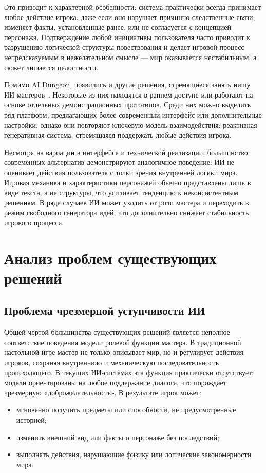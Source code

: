 Это приводит к характерной особенности: система практически всегда принимает любое действие игрока, даже если оно нарушает причинно-следственные связи, изменяет факты, установленные ранее, или не согласуется с концепцией персонажа. Подтверждение любой инициативы пользователя часто приводит к разрушению логической структуры повествования и делает игровой процесс непредсказуемым в нежелательном смысле --- мир оказывается нестабильным, а сюжет лишается целостности.

Помимо AI Dungeon, появились и другие решения, стремящиеся занять нишу ИИ-мастеров~\cite{AIDungeonChi,DungeonMasterAI,HyperWriteAI}. Некоторые из них находятся в раннем доступе или работают на основе отдельных демонстрационных прототипов. Среди них можно выделить ряд платформ, предлагающих более современный интерфейс или дополнительные настройки, однако они повторяют ключевую модель взаимодействия: реактивная генеративная система, стремящаяся поддержать любые действия игрока.

Несмотря на вариации в интерфейсе и технической реализации, большинство современных альтернатив демонстрируют аналогичное поведение: ИИ не оценивает действия пользователя с точки зрения внутренней логики мира. Игровая механика и характеристики персонажей обычно представлены лишь в виде текста, а не структуры, что усиливает тенденцию к неконсистентным решениям. В ряде случаев ИИ может уходить от роли мастера и переходить в режим свободного генератора идей, что дополнительно снижает стабильность игрового процесса.

\section{Анализ проблем существующих решений}

\subsection*{Проблема чрезмерной уступчивости ИИ}

Общей чертой большинства существующих решений является неполное соответствие поведения модели ролевой функции мастера. В традиционной настольной игре мастер не только описывает мир, но и регулирует действия игроков, сохраняя внутреннюю и механическую последовательность происходящего. В текущих ИИ-системах эта функция практически отсутствует: модели ориентированы на любое поддержание диалога, что порождает чрезмерную «доброжелательность». В результате игрок может:

\begin{itemize}
	\item мгновенно получить предметы или способности, не предусмотренные историей;
	\item изменить внешний вид или факты о персонаже без последствий;
	\item выполнять действия, нарушающие физику или логические закономерности мира.
\end{itemize}

